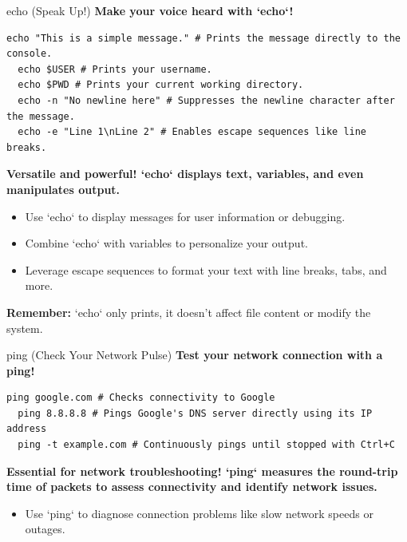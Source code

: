 \documentclass{beamer}
\begin{document}
\begin{frame}[fragile]{echo (Speak Up!)}
  \textbf{Make your voice heard with `echo`!}

  \begin{lstlisting}[frame=none]
  echo "This is a simple message." # Prints the message directly to the console.
  echo $USER # Prints your username.
  echo $PWD # Prints your current working directory.
  echo -n "No newline here" # Suppresses the newline character after the message.
  echo -e "Line 1\nLine 2" # Enables escape sequences like line breaks.
  \end{lstlisting}

  \textbf{Versatile and powerful! `echo` displays text, variables, and even manipulates output.}

  \begin{itemize}
    \item Use `echo` to display messages for user information or debugging.
    \item Combine `echo` with variables to personalize your output.
    \item Leverage escape sequences to format your text with line breaks, tabs, and more.
  \end{itemize}

  \textbf{Remember:} `echo` only prints, it doesn't affect file content or modify the system.
\end{frame}

\begin{frame}[fragile]{ping (Check Your Network Pulse)}
	\textbf{Test your network connection with a ping!}

  \begin{lstlisting}[frame=none]
  ping google.com # Checks connectivity to Google
  ping 8.8.8.8 # Pings Google's DNS server directly using its IP address
  ping -t example.com # Continuously pings until stopped with Ctrl+C
  \end{lstlisting}

  \textbf{Essential for network troubleshooting! `ping` measures the round-trip time of packets to assess connectivity and identify network issues.}

  \begin{itemize}
    \item Use `ping` to diagnose connection problems like slow network speeds or outages.
  \end{itemize}
\end{frame}
\end{document}

